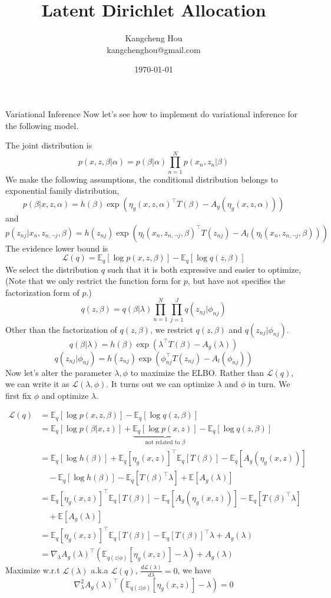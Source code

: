 \documentclass{beamer}
\title{Latent Dirichlet Allocation}
\author{Kangcheng Hou\\kangchenghou@gmail.com}
\institute{Zhejiang University}
\date{\today}
\begin{document}
    
\frame{\titlepage}

%  

\begin{frame}[allowframebreaks]{Variational Inference}
Now let's see how to implement do variational inference for the following model.

The joint distribution is 
$$p(x,z,\beta | \alpha)=p(\beta | \alpha)\prod_{n=1}^N p(x_n,z_n | \beta)$$
We make the following assumptions, the conditional distribution belongs to exponential family distribution,
$$p(\beta | x,z,\alpha)=h(\beta)\exp(\eta_g (x,z,\alpha)^\top T(\beta)-A_g(\eta_g(x,z,\alpha)))$$
and
$$\scriptstyle p(z_{nj}|x_n,z_{n,\neg j},\beta)=h(z_{nj})\exp(\eta_l(x_n,z_{n,\neg j},\beta)^\top T(z_{nj})-A_l(\eta_l(x_n,z_{n,\neg j},\beta)))$$
The evidence lower bound is
$$\mathcal{L}(q)=\mathbb{E}_q[\log p(x,z,\beta)]-\mathbb{E}_q[\log q(z,\beta)]$$
We select the distribution $q$ such that it is both expressive and easier to optimize, (Note that we only restrict the function form for $p$, but have not specifies the factorization form of $p$.)
$$q(z,\beta)=q(\beta|\lambda)\prod_{n=1}^N \prod_{j=1}^J q(z_{nj}|\phi_{nj})$$
Other than the factorization of $q(z,\beta)$, we restrict $q(z, \beta)$ and $q(z_{nj} | \phi_{nj})$.
$$q(\beta | \lambda)=h(\beta)\exp(\lambda^\top T(\beta)-A_g(\lambda))$$
$$q(z_{nj}|\phi_{nj})=h(z_{nj})\exp(\phi_{nj}^\top T(z_{nj})-A_l(\phi_{nj}))$$
Now let's alter the parameter $\lambda, \phi$ to maximize the ELBO.
Rather than $\mathcal{L}(q)$, we can write it as $\mathcal{L}(\lambda, \phi)$.
It turns out we can optimize $\lambda$ and $\phi$ in turn.  We first fix $\phi$ and optimize $\lambda$. 

\begin{align*}
\mathcal{L}(q)& =\mathbb{E}_q[\log p(x,z,\beta)]-\mathbb{E}_q[\log q(z,\beta)] \\
& = \mathbb{E}_q[\log p(\beta | x,z)] + \underbrace{\mathbb{E}_q[\log p(x,z)]}_{\text{not related to }\beta}-\mathbb{E}_q[\log q(z,\beta)] \\
& = \mathbb{E}_q[\log h(\beta)] + \mathbb{E}_q[\eta_g (x,z)]^\top \mathbb{E}_q[T(\beta)]-\mathbb{E}_q[A_g(\eta_g(x,z))]  \\ 
& \quad  - \mathbb{E}_q[\log h(\beta)] - \mathbb{E}_q[T(\beta)^\top \lambda] +  \mathbb{E}[A_g(\lambda)] \\
& = \mathbb{E}_q[\eta_g (x,z)]^\top\mathbb{E}_q[T(\beta)]-\mathbb{E}_q[A_g(\eta_g(x,z))] - \mathbb{E}_q[T(\beta)^\top \lambda] \\ 
& \quad + \mathbb{E}[A_g(\lambda)] \\ 
& = \mathbb{E}_q[\eta_g (x,z)]^\top\mathbb{E}_q[T(\beta)] - \mathbb{E}_q[T(\beta)]^\top\lambda + A_g(\lambda) \\
& = \nabla_\lambda A_g(\lambda)^\top(\mathbb{E}_{q(z | \phi)}[\eta_g (x,z)] - \lambda) + A_g(\lambda)
\end{align*}
Maximize w.r.t $\mathcal{L}(\lambda)$ a.k.a $\mathcal{L}(q)$, $\frac{d\mathcal{L}(\lambda)}{d \lambda} = 0$, we have 
$$\nabla^2_\lambda A_g(\lambda)^\top(\mathbb{E}_{q(z | \phi)}[\eta_g (x,z)] - \lambda) = 0$$


\end{frame}
\end{document}
